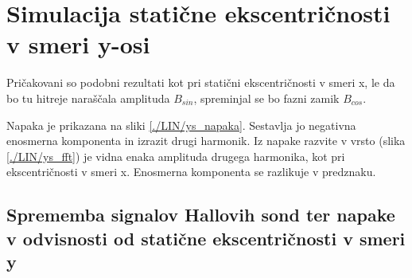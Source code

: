 \section{Simulacija statične ekscentričnosti v smeri y-osi}

Pričakovani so podobni rezultati kot pri statični ekscentričnosti v smeri x, le da bo tu hitreje naraščala amplituda $B_{sin}$, spreminjal se bo fazni zamik $B_{cos}$.
 

Napaka je prikazana na sliki \ref{./LIN/ys_napaka}. Sestavlja jo negativna enosmerna komponenta in izrazit drugi harmonik. Iz napake razvite v vrsto (slika \ref{./LIN/ys_fft}) je vidna enaka amplituda drugega harmonika, kot pri ekscentričnosti v smeri x. Enosmerna komponenta se razlikuje v predznaku.
\newpage
\subsection{Sprememba signalov Hallovih sond ter napake v odvisnosti od statične ekscentričnosti v smeri y}

